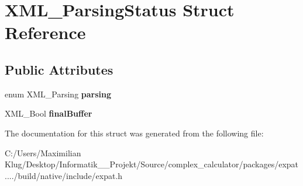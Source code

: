 \hypertarget{struct_x_m_l___parsing_status}{}\section{X\+M\+L\+\_\+\+Parsing\+Status Struct Reference}
\label{struct_x_m_l___parsing_status}
\subsection*{Public Attributes}
\begin{DoxyCompactItemize}
\item 
\mbox{\label{struct_x_m_l___parsing_status_af7f58f4731cf34a10da39dd7b9cfb82b}} 
enum X\+M\+L\+\_\+\+Parsing {\bfseries parsing}
\item 
\mbox{\label{struct_x_m_l___parsing_status_ac9f1a8f3a0f2f0e886760756c0022880}} 
X\+M\+L\+\_\+\+Bool {\bfseries final\+Buffer}
\end{DoxyCompactItemize}


The documentation for this struct was generated from the following file\+:\begin{DoxyCompactItemize}
\item 
C\+:/\+Users/\+Maximilian Klug/\+Desktop/\+Informatik\+\_\+\_\+\+Projekt/\+Source/complex\+\_\+calculator/packages/expat..../build/native/include/expat.\+h\end{DoxyCompactItemize}
